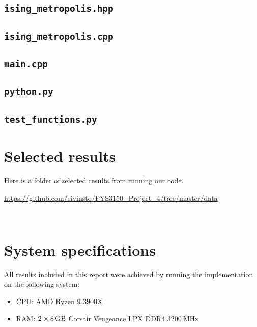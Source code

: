 \documentclass[reprint,english,notitlepage]{revtex4-1}  %
\begin{document}
\cprotect\subsection{\verb+ising_metropolis.hpp+} \label{A.1}

\cprotect\subsection{\verb+ising_metropolis.cpp+} \label{A.2}

\cprotect\subsection{\verb+main.cpp+} \label{A.3}

\cprotect\subsection{\verb+python.py+} \label{A.4}

\cprotect\subsection{\verb+test_functions.py+} \label{A.5}

\newpage
\section{Selected results} \label{B}
Here is a folder of selected results from running our code.

\url{https://github.com/eivinsto/FYS3150_Project_4/tree/master/data}

~
\newpage
\section{System specifications} \label{C}
All results included in this report were achieved by running the implementation on the following system:

\begin{itemize}
	\item CPU: AMD Ryzen \(9\) \(3900\)X
	\item RAM: \(2\times\SI{8}{\giga\byte}\) Corsair Vengeance LPX DDR\(4\) \(\SI{3200}{\mega\hertz}\)
\end{itemize}
\end{document}

